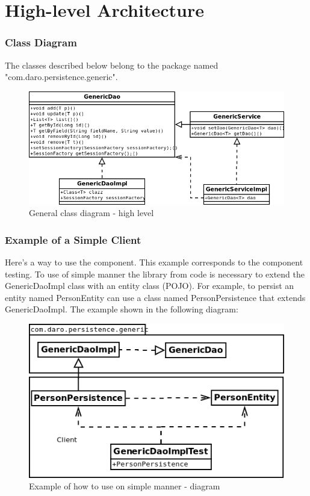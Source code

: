 \documentclass[a4paper,11pt]{book}
\begin{document}
\section{High-level Architecture}

\pagebreak
\subsubsection{Class Diagram}
The classes described below belong to the package named "com.daro.persistence.generic".

\begin{figure}[h] %
  \includegraphics[width=\textwidth]{generic_persistence_class_diagram}
  \caption{General class diagram - high level}
  \centering
  \label{fig:generic_persistence_class_diagram} %
\end{figure}

\pagebreak
\subsubsection{Example of a Simple Client}
Here's a way to use the component. This example corresponds to the component testing.
To use of simple manner the library from code is necessary to extend the GenericDaoImpl class with an entity class (POJO).
For example, to persist an entity named PersonEntity can use a class named PersonPersistence that extends GenericDaoImpl.
The example shown in the following diagram:

\begin{figure}[h] %
  \includegraphics[width=\textwidth]{generic_persistence_class_diagram_to_use_simple}
  \caption{Example of how to use on simple manner - diagram}
  \centering
  \label{fig:generic_persistence_class_diagram_to_use_simple} %
\end{figure}
\end{document}
